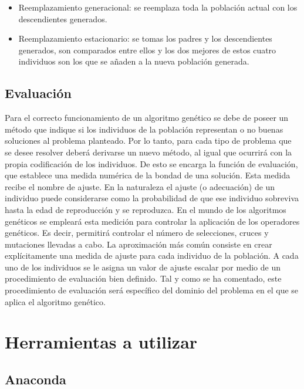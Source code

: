 \begin{itemize}
    \item Reemplazamiento generacional: se reemplaza toda la población actual con los descendientes generados.
    \item Reemplazamiento estacionario: se tomas los padres y los descendientes generados, son comparados entre ellos y los dos mejores de estos cuatro individuos son los que se añaden a la nueva población generada.
\end{itemize}


\subsection{Evaluación}
Para el correcto funcionamiento de un algoritmo genético se debe de poseer un método que indique si los individuos de la población representan o no buenas soluciones al problema planteado. Por lo tanto, para cada tipo de problema que se desee resolver deberá derivarse un nuevo método, al igual que ocurrirá con la propia codificación de los individuos.
De esto se encarga la función de evaluación, que establece una medida numérica de la bondad de una solución. Esta medida recibe el nombre de ajuste. En la naturaleza el ajuste (o adecuación) de un individuo puede considerarse como la probabilidad de que ese individuo sobreviva hasta la edad de reproducción y se reproduzca. En el mundo de los algoritmos genéticos se empleará esta medición para controlar la aplicación de los operadores genéticos. Es decir, permitirá controlar el número de selecciones, cruces y mutaciones llevadas a cabo. La aproximación más común consiste en crear explícitamente una medida de ajuste para cada individuo de la población. A cada uno de los individuos se le asigna un valor de ajuste escalar por medio de un procedimiento de evaluación bien definido. Tal y como se ha comentado, este procedimiento de evaluación será específico del dominio del problema en el que se aplica el algoritmo genético.


\newpage

\section{Herramientas a utilizar}
\subsection{Anaconda}

